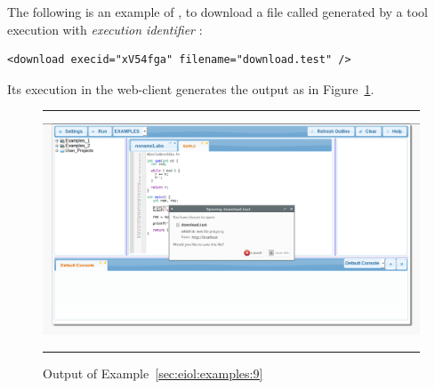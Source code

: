 \begin{example}
\label{sec:eiol:examples:9}
%
The following is an example of ,
to download a file called  generated by a
tool execution with \emph{execution identifier} :

\medskip
\begin{lstlisting}[mathescape=false]
<download execid="xV54fga" filename="download.test" />
\end{lstlisting}
\medskip
\noindent
Its execution in the web-client generates the output as in
Figure~\ref{fig:examples:9}.

\begin{figure}[h]
\hrule\smallskip
\begin{center}
\includegraphics[width=1\textwidth]{fig/example9.png}
\end{center}
\caption{Output of Example~\ref{sec:eiol:examples:9}}
\label{fig:examples:9}
\hrule
\end{figure}
\end{example}

